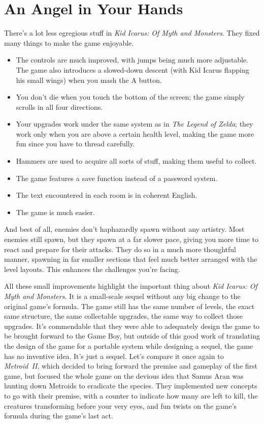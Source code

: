 \documentclass{book}
\begin{document}
\FloatBarrier\needspace{5pt}\section*{An Angel in Your Hands}\nopagebreak[4]

There’s a lot less egregious stuff in \emph{Kid Icarus: Of Myth and Monsters}. They fixed many things to make the game enjoyable.

\begin{itemize} \setlength\itemsep{-0.4em}
\item The controls are much improved, with jumps being much more adjustable. The game also introduces a slowed-down descent (with Kid Icarus flapping his small wings) when you mash the A button.
\item You don’t die when you touch the bottom of the screen; the game simply scrolls in all four directions.
\item Your upgrades work under the same system as in \emph{The Legend of Zelda}; they work only when you are above a certain health level, making the game more fun since you have to thread carefully.
\item Hammers are used to acquire all sorts of stuff, making them useful to collect.
\item The game features a save function instead of a password system.
\item The text encountered in each room is in coherent English.
\item The game is much easier.
\end{itemize}\noindent

And best of all, enemies don’t haphazardly spawn without any artistry. Most enemies still spawn, but they spawn at a far slower pace, giving you more time to react and prepare for their attacks. They do so in a much more thoughtful manner, spawning in far smaller sections that feel much better arranged with the level layouts. This enhances the challenges you’re facing.

All these small improvements highlight the important thing about \emph{Kid Icarus: Of Myth and Monsters}. It is a small-scale sequel without any big change to the original game’s formula. The game still has the same number of levels, the exact same structure, the same collectable upgrades, the same way to collect those upgrades. It’s commendable that they were able to adequately design the game to be brought forward to the Game Boy, but outside of this good work of translating the design of the game for a portable system while designing a sequel, the game has no inventive idea. It’s just a sequel. Let’s compare it once again to \emph{Metroid II}, which decided to bring forward the premise and gameplay of the first game, but focused the whole game on the devious idea that Samus Aran was hunting down Metroids to eradicate the species. They implemented new concepts to go with their premise, with a counter to indicate how many are left to kill, the creatures transforming before your very eyes, and fun twists on the game’s formula during the game’s last act.
\end{document}
